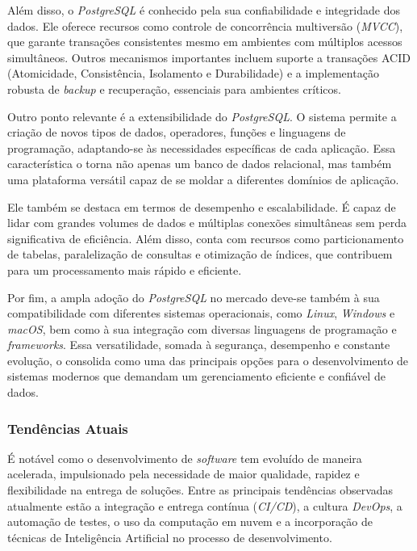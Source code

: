 \documentclass[english,brazilian]{UNISINOSartigo} %
\begin{document}
Além disso, o \textit{PostgreSQL} é conhecido pela sua confiabilidade e integridade dos dados. Ele oferece recursos como controle de concorrência multiversão (\textit{MVCC}), que garante transações consistentes mesmo em ambientes com múltiplos acessos simultâneos. Outros mecanismos importantes incluem suporte a transações ACID (Atomicidade, Consistência, Isolamento e Durabilidade) e a implementação robusta de \textit{backup} e recuperação, essenciais para ambientes críticos.

Outro ponto relevante é a extensibilidade do \textit{PostgreSQL}. O sistema permite a criação de novos tipos de dados, operadores, funções e linguagens de programação, adaptando-se às necessidades específicas de cada aplicação. Essa característica o torna não apenas um banco de dados relacional, mas também uma plataforma versátil capaz de se moldar a diferentes domínios de aplicação.

Ele também se destaca em termos de desempenho e escalabilidade. É capaz de lidar com grandes volumes de dados e múltiplas conexões simultâneas sem perda significativa de eficiência. Além disso, conta com recursos como particionamento de tabelas, paralelização de consultas e otimização de índices, que contribuem para um processamento mais rápido e eficiente.

Por fim, a ampla adoção do \textit{PostgreSQL} no mercado deve-se também à sua compatibilidade com diferentes sistemas operacionais, como \textit{Linux}, \textit{Windows} e \textit{macOS}, bem como à sua integração com diversas linguagens de programação e \textit{frameworks}. Essa versatilidade, somada à segurança, desempenho e constante evolução, o consolida como uma das principais opções para o desenvolvimento de sistemas modernos que demandam um gerenciamento eficiente e confiável de dados.

\subsubsection{Tendências Atuais}

É notável como o desenvolvimento de \textit{software} tem evoluído de maneira acelerada, impulsionado pela necessidade de maior qualidade, rapidez e flexibilidade na entrega de soluções. Entre as principais tendências observadas atualmente estão a integração e entrega contínua (\textit{CI/CD}), a cultura \textit{DevOps}, a automação de testes, o uso da computação em nuvem e a incorporação de técnicas de Inteligência Artificial no processo de desenvolvimento.
\end{document}
